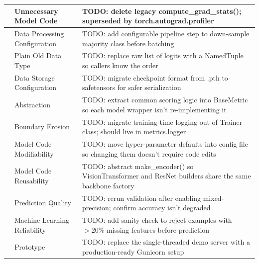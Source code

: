 \begin{table}[ht!]
\begin{tabularx}{\textwidth}{
    >{\centering\arraybackslash}p{0.8cm}
    >{\centering\arraybackslash}p{2.8cm}
    X 
}
\cline{2-3}
 & Unnecessary Model Code & TODO: delete legacy compute\_grad\_stats(); superseded by torch.autograd.profiler \\
\hline
\multirow{6}{*}{DTD} & Data Processing Configuration & TODO: add configurable pipeline step to down-sample majority class before batching \\
\cline{2-3}
 & Plain Old Data Type & TODO: replace raw list of logits with a NamedTuple so callers know the order \\
\cline{2-3}
 & Data Storage Configuration & TODO: migrate checkpoint format from .pth to safetensors for safer serialization \\
\hline
\multirow{8}{*}{MDL} & Abstraction & TODO: extract common scoring logic into BaseMetric so each model wrapper isn’t re-implementing it \\
\cline{2-3}
 & Boundary Erosion & TODO: migrate training-time logging out of Trainer class; should live in metrics.logger \\
\cline{2-3}
 & Model Code Modifiability & TODO: move hyper-parameter defaults into config file so changing them doesn’t require code edits \\
\cline{2-3}
 & Model Code Reusability & TODO: abstract make\_encoder() so VisionTransformer and ResNet builders share the same backbone factory \\
\hline
\multirow{4}{*}{PRF} & Prediction Quality & TODO: rerun validation after enabling mixed-precision; confirm accuracy isn’t degraded \\
\cline{2-3}
 & Machine Learning Reliability & TODO: add sanity-check to reject examples with $> 20\%$ missing features before prediction \\
\hline
\multirow{2}{*}{SCL} & Prototype & TODO: replace the single-threaded demo server with a production-ready Gunicorn setup \\
\hline
\end{tabularx}
\end{table}